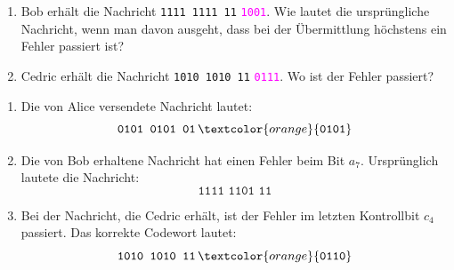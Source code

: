 \begin{myexercise}
\begin{enumerate}
		\item Bob erhält die Nachricht
		      \texttt{1111 1111 11}
		      \textcolor{magenta}{\texttt{1001}}.
		      Wie lautet die ursprüngliche Nachricht,
		      wenn man davon ausgeht, dass bei der
		      Übermittlung höchstens ein Fehler
		      passiert ist?

		\item Cedric erhält die Nachricht
		      \texttt{1010 1010 11}
		      \textcolor{magenta}{\texttt{0111}}.
		      Wo ist der Fehler passiert?
	\end{enumerate}

	\begin{myanswer}
		\begin{enumerate}
			\item Die von Alice versendete Nachricht lautet:
			      \[
				      \texttt{0101 0101 01}\,
				      \textcolor{orange}{\texttt{0101}}
			      \]

			\item Die von Bob erhaltene Nachricht hat einen Fehler
			      beim Bit \(a_7\). Ursprünglich lautete die Nachricht:
			      \[
				      \texttt{1111 1101 11}
			      \]

			\item Bei der Nachricht, die Cedric erhält, ist der Fehler
			      im letzten Kontrollbit \(c_4\) passiert.
			      Das korrekte Codewort lautet:
			      \[
				      \texttt{1010 1010 11}\,
				      \textcolor{orange}{\texttt{0110}}
			      \]
		\end{enumerate}
	\end{myanswer}

\end{myexercise}



